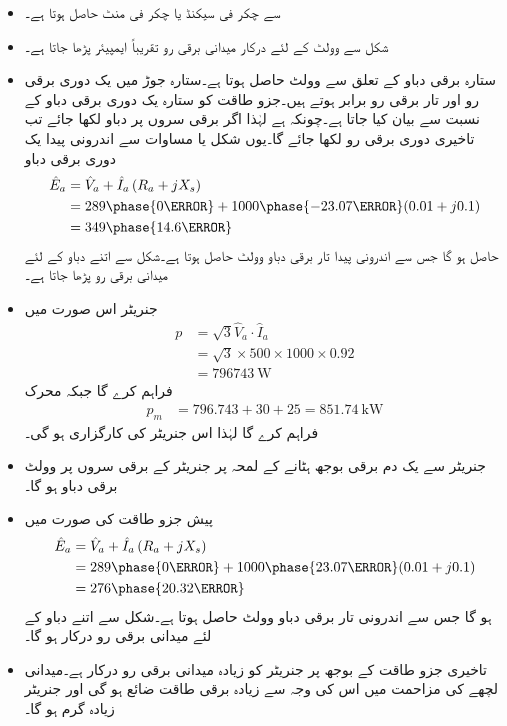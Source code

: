 \begin{itemize}
\item
{} سے  چکر فی سیکنڈ یا  چکر فی منٹ حاصل ہوتا ہے۔
\item
شکل   سے    وولٹ کے لئے درکار میدانی برقی رو تقریباً  ایمپیئر پڑھا جاتا  ہے۔
\item
ستارہ برقی دباو کے تعلق  سے   وولٹ حاصل ہوتا ہے۔ستارہ جوڑ میں یک دوری برقی رو اور تار برقی رو برابر ہوتے ہیں۔جزو طاقت کو ستارہ یک دوری برقی دباو کے نسبت سے بیان کیا جاتا ہے۔چونکہ  ہے لہٰذا اگر برقی سروں پر دباو  لکھا جائے تب تاخیری دوری برقی رو   لکھا جائے گا۔یوں شکل  یا مساوات  سے اندرونی پیدا یک دوری برقی دباو
\begin{align*}
\hat{E}_a&=\hat{V}_{a}+\hat{I}_a \left(R_a+j X_s \right)\\
&= 289\phase{0 \degree}+1000 \phase {-23.07 \degree} ( 0.01 +j 0.1)\\
&=349\phase{14.6 \degree}
\end{align*}
حاصل ہو گا جس سے اندرونی پیدا تار برقی دباو  وولٹ حاصل ہوتا ہے۔شکل  سے اتنے دباو کے لئے   میدانی برقی رو پڑھا جاتا ہے۔
\item
جنریٹر اس صورت میں
\begin{align*}
p&=\sqrt{3} \hat{V}_{a} \cdot \hat{I}_a\\
&=\sqrt{3} \times 500 \times 1000 \times 0.92\\
&=\SI{796743}{\watt}
\end{align*}
فراہم کرے گا  جبکہ محرک 
\begin{align*}
p_m&=796.743+30+25=\SI{851.74}{\kilo \watt}
\end{align*}
فراہم کرے گا  لہٰذا اس جنریٹر کی کارگزاری  ہو گی۔ 
\item
جنریٹر سے یک دم برقی بوجھ ہٹانے کے  لمحہ پر جنریٹر کے برقی سروں پر   وولٹ برقی دباو ہو گا۔
\item
پیش جزو طاقت کی صورت میں
\begin{align*}
\hat{E}_a&=\hat{V}_{a}+\hat{I}_a \left(R_a+j X_s \right)\\
&= 289\phase{0 \degree}+1000 \phase {23.07 \degree} ( 0.01 +j 0.1)\\
&=276\phase{20.32 \degree}
\end{align*}
ہو گا جس سے اندرونی  تار برقی دباو  وولٹ حاصل ہوتا ہے۔شکل  سے اتنے دباو کے لئے   میدانی برقی رو درکار ہو گا۔
\item
تاخیری جزو طاقت کے بوجھ پر جنریٹر کو زیادہ میدانی برقی رو درکار ہے۔میدانی لچھے کی مزاحمت میں اس کی وجہ سے زیادہ برقی طاقت ضائع ہو گی اور جنریٹر  زیادہ گرم ہو گا۔
\end{itemize}
